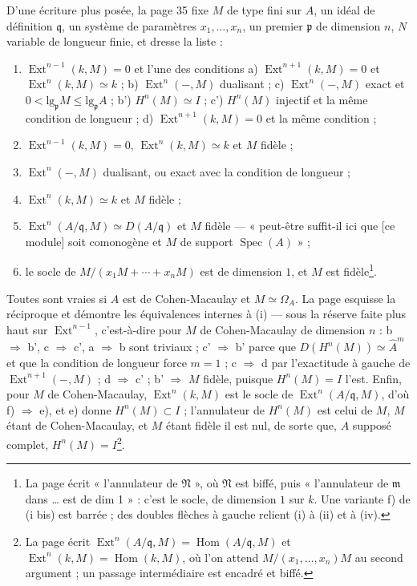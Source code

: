\documentclass[11pt,a4paper]{article}
\begin{document}
D'une écriture plus posée, la page 35 fixe $M$ de type fini sur $A$, un idéal
de définition $\mathfrak{q}$, un système de paramètres $x_1, \ldots, x_n$, un
premier $\mathfrak{p}$ de dimension $n$, $N$ variable de longueur finie, et
dresse la liste :
\begin{enumerate}
\item[(i)] $\operatorname{Ext}^{n-1}(k, M) = 0$ et l'une des conditions a)
$\operatorname{Ext}^{n+1}(k, M) = 0$ et $\operatorname{Ext}^n(k, M) \simeq k$ ;
b) $\operatorname{Ext}^n(-, M)$ dualisant ; c) $\operatorname{Ext}^n(-, M)$
exact et $0 < \mathrm{lg}_{\mathfrak{p}} M \leqslant \mathrm{lg}_{\mathfrak{p}}
A$ ; b') $H^n(M) \simeq I$ ; c') $H^n(M)$ injectif et la même condition de
longueur ; d) $\operatorname{Ext}^{n+1}(k, M) = 0$ et la même condition ;
\item[(i bis)] $\operatorname{Ext}^{n-1}(k, M) = 0$, $\operatorname{Ext}^n(k, M)
\simeq k$ et $M$ fidèle ;
\item[(ii)] $\operatorname{Ext}^n(-, M)$ dualisant, ou exact avec la condition
de longueur ;
\item[(iii)] $\operatorname{Ext}^n(k, M) \simeq k$ et $M$ fidèle ;
\item[(iv)] $\operatorname{Ext}^n(A/\mathfrak{q}, M) \simeq D(A/\mathfrak{q})$
et $M$ fidèle --- « peut-être suffit-il ici que [ce module] soit comonogène et
$M$ de support $\operatorname{Spec}(A)$ » ;
\item[(v)] le socle de $M/(x_1M + \cdots + x_nM)$ est de dimension $1$, et $M$
est fidèle\footnote{La page écrit « l'annulateur de $\mathfrak{N}$ », où
$\mathfrak{N}$ est biffé, puis « l'annulateur de $\mathfrak{m}$ dans … est de
dim 1 » : c'est le socle, de dimension $1$ sur $k$. Une variante f) de (i bis)
est barrée ; des doubles flèches à gauche relient (i) à (ii) et à (iv).}.
\end{enumerate}
Toutes sont vraies si $A$ est de Cohen-Macaulay et $M \simeq \Omega_A$. La
page esquisse la réciproque et démontre les équivalences internes à (i) --- sous
la réserve faite plus haut sur $\operatorname{Ext}^{n-1}$, c'est-à-dire pour $M$
de Cohen-Macaulay de dimension $n$ : b $\Rightarrow$ b', c $\Rightarrow$ c',
a $\Rightarrow$ b sont triviaux ; c' $\Rightarrow$ b' parce que $D(H^n(M))
\simeq \widehat{A}^m$ et que la condition de longueur force $m = 1$ ; c
$\Rightarrow$ d par l'exactitude à gauche de $\operatorname{Ext}^{n+1}(-, M)$ ;
d $\Rightarrow$ c' ; b' $\Rightarrow$ $M$ fidèle, puisque $H^n(M) = I$ l'est.
Enfin, pour $M$ de Cohen-Macaulay, $\operatorname{Ext}^n(k, M)$ est le socle de
$\operatorname{Ext}^n(A/\mathfrak{q}, M)$, d'où f) $\Rightarrow$ e), et e)
donne $H^n(M) \subset I$ ; l'annulateur de $H^n(M)$ est celui de $M$, $M$
étant de Cohen-Macaulay, et $M$ étant fidèle il est nul, de sorte que, $A$
supposé complet, $H^n(M) = I$\footnote{La page écrit
$\operatorname{Ext}^n(A/\mathfrak{q}, M) = \operatorname{Hom}(A/\mathfrak{q},
M)$ et $\operatorname{Ext}^n(k, M) = \operatorname{Hom}(k, M)$, où l'on attend
$M/(x_1, \ldots, x_n)M$ au second argument ; un passage intermédiaire est
encadré et biffé.}.
\end{document}
